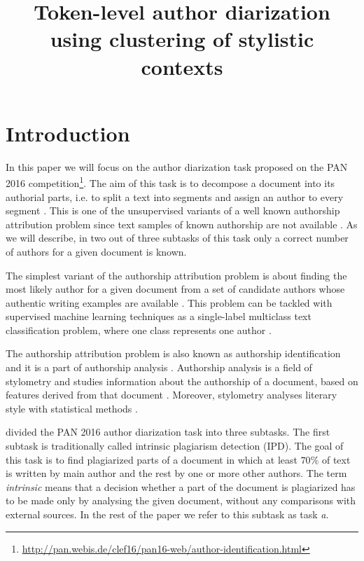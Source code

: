 \documentclass[10pt, a4paper]{article}
\title{Token-level author diarization using clustering of stylistic contexts}
\begin{document}
\maketitleabstract

\section{Introduction}
In this paper we will focus on the author diarization task proposed on the PAN 2016 competition\footnote{\url{http://pan.webis.de/clef16/pan16-web/author-identification.html}}. The aim of this task is to decompose a document into its authorial parts, i.e. to split a text into segments and assign an author to every segment \citep{koppel-2011,aldebei-2015}. This is one of the unsupervised variants of a well known authorship attribution problem since text samples of known authorship are not available \citep{rosso-2016}. As we will describe, in two out of three subtasks of this task only a correct number of authors for a given document is known.

The simplest variant of the authorship attribution problem is about finding the most likely author for a given document from a set of candidate authors whose authentic writing examples are available \citep{stamatatos-2009a,stein-2011,ding-2016}. This problem can be tackled with supervised machine learning techniques as a {{{single-label}}} multiclass text classification problem, where one class represents one author \citep{stamatatos-2009a}. 

The authorship attribution problem is also known as authorship identification and it is a part of authorship analysis \citep{stamatatos-2009a,ding-2016}. Authorship analysis is a field of stylometry and studies information about the authorship of a document, based on features derived from that document \citep{layton-2013}. Moreover, stylometry analyses literary style with statistical methods  \citep{stein-2011}.	

\citet{rosso-2016} divided the PAN 2016 author diarization task into three subtasks. The first subtask is traditionally called intrinsic plagiarism detection (IPD). The goal of this task is to find plagiarized parts of a document in which at least $70\%$ of text is written by main author and the rest by one or more other authors. The term \emph{intrinsic} means that a decision whether a part of the document is plagiarized has to be made only by analysing the given document, without any comparisons with external sources. In the rest of the paper we refer to this subtask as task \emph{a}.
\end{document}

